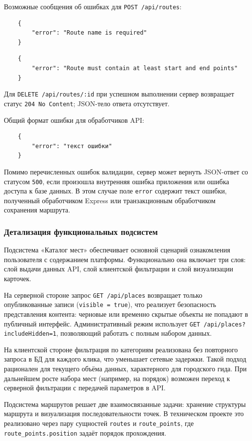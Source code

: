 Возможные сообщения об ошибках для \texttt{POST /api/routes}:
\begin{verbatim}
	{
		"error": "Route name is required"
	}
\end{verbatim}

\begin{verbatim}
	{
		"error": "Route must contain at least start and end points"
	}
\end{verbatim}

Для \texttt{DELETE /api/routes/:id} при успешном выполнении сервер возвращает
статус \texttt{204 No Content}; JSON-тело ответа отсутствует.

Общий формат ошибки для обработчиков API:
\begin{verbatim}
	{
		"error": "текст ошибки"
	}
\end{verbatim}

Помимо перечисленных ошибок валидации, сервер может вернуть JSON-ответ со
статусом \texttt{500}, если произошла внутренняя ошибка приложения или ошибка
доступа к базе данных. В этом случае поле \texttt{error} содержит текст ошибки,
полученный обработчиком Express или транзакционным обработчиком сохранения
маршрута.

\subsubsection{Детализация функциональных подсистем}
Подсистема «Каталог мест» обеспечивает основной сценарий ознакомления
пользователя с содержанием платформы. Функционально она включает три слоя:
слой выдачи данных API, слой клиентской фильтрации и слой визуализации карточек.

На серверной стороне запрос \texttt{GET /api/places} возвращает только опубликованные
записи (\texttt{visible = true}), что реализует безопасность представления контента:
черновые или временно скрытые объекты не попадают в публичный интерфейс.
Административный режим использует \texttt{GET /api/places?includeHidden=1},
позволяющий работать с полным набором данных.

На клиентской стороне фильтрация по категориям реализована без повторного запроса
в БД для каждого клика, что уменьшает сетевые задержки. Такой подход рационален
для текущего объёма данных, характерного для городского гида. При дальнейшем росте
набора мест (например, на порядок) возможен переход к серверной фильтрации с
передачей параметров в API.

Подсистема маршрутов решает две взаимосвязанные задачи: хранение структуры
маршрута и визуализация последовательности точек. В техническом проекте это
реализовано через пару сущностей \texttt{routes} и \texttt{route\_points}, где
\texttt{route\_points.position} задаёт порядок прохождения.

